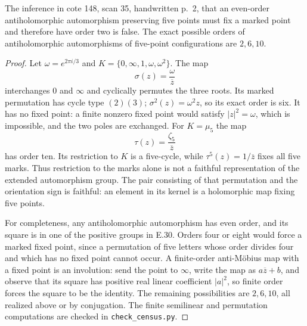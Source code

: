 The inference in cote 148, scan 35, handwritten p.~2, that an
even-order antiholomorphic automorphism preserving five points
must fix a marked point and therefore have order two is false.
The exact possible orders of antiholomorphic automorphisms of
five-point configurations are $2,6,10$.
\begin{proof}
Let $\omega=e^{2\pi i/3}$ and
$K=\{0,\infty,1,\omega,\omega^2\}$.  The map
\[
 \sigma(z)=\frac{\omega}{\overline z}
\]
interchanges $0$ and $\infty$ and cyclically permutes the three
roots.  Its marked permutation has cycle type $(2)(3)$;
$\sigma^2(z)=\omega^2z$, so its exact order is six.
It has no fixed point: a finite nonzero fixed point would satisfy
$|z|^2=\omega$, which is impossible, and the two poles are exchanged.
For $K=\mu_5$ the map
\[
 \tau(z)=\frac{\zeta_5}{\overline z}
\]
has order ten.  Its restriction to $K$ is a five-cycle, while
$\tau^5(z)=1/\overline z$ fixes all five marks.  Thus restriction
to the marks alone is not a faithful representation of the extended
automorphism group.  The pair consisting of that permutation and
the orientation sign is faithful: an element in its kernel is a
holomorphic map fixing five points.

For completeness, any antiholomorphic automorphism has even order,
and its square is in one of the positive groups in E.30.  Orders
four or eight would force a marked fixed point, since a permutation
of five letters whose order divides four and which has no fixed
point cannot occur.  A finite-order anti-M\"obius map with a fixed
point is an involution: send the point to $\infty$, write the map
as $a\overline z+b$, and observe that its square has positive real
linear coefficient $|a|^2$, so finite order forces the square to
be the identity.  The remaining possibilities are $2,6,10$, all
realized above or by conjugation.  The finite semilinear and
permutation computations are checked in \texttt{check\_census.py}.
\end{proof}

